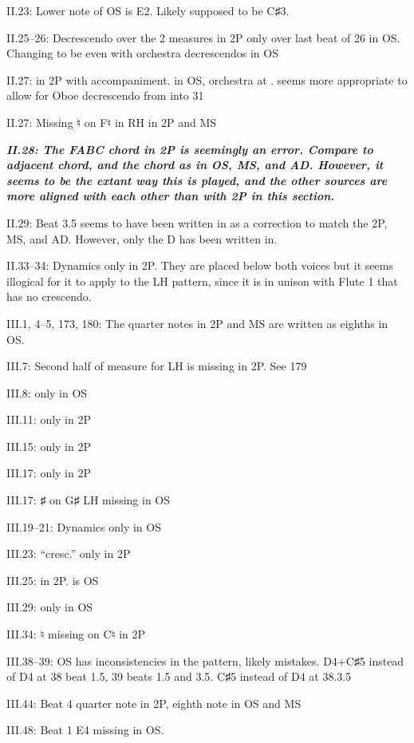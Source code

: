 \documentclass[twoside]{article}
\newcommand\dynmark[1]{\scalebox{0.9}{#1}{\kern1pt}}
\begin{document}
\begin{hangparas}{15pt}{1}
\begin{multicols}{2}
II.23: Lower note of OS is E2. Likely supposed to be C♯3.

II.25--26: Decrescendo over the 2 measures in 2P only over last beat of 26 in OS. Changing to be even with orchestra decrescendos in OS

II.27: \dynmark{\pp} in 2P with \dynmark{\mezzopiano} accompaniment. \dynmark{\p} in OS, orchestra at \dynmark{\p}. \dynmark{\pp} seems more appropriate to allow for Oboe decrescendo from \dynmark{\p} into 31

II.27: Missing ♮ on F♮ in RH in 2P and MS

\textbf{\textit{II.28: The FABC chord in 2P is seemingly an error. Compare to adjacent chord, and the chord as in OS, MS, and AD. However, it seems to be the extant way this is played, and the other sources are more aligned with each other than with 2P in this section.}}

II.29: Beat 3.5 seems to have been written in as a correction to match the 2P, MS, and AD. However, only the D has been written in.

II.33--34: Dynamics only in 2P. They are placed below both voices but it seems illogical for it to apply to the LH pattern, since it is in unison with Flute 1 that has no crescendo.

III.1, 4--5, 173, 180: The quarter notes in 2P and MS are written as eighths in OS.

III.7: Second half of measure for LH is missing in 2P. See 179

III.8: \dynmark{\mf} only in OS

III.11: \dynmark{\ff} only in 2P

III.15: \dynmark{\f} only in 2P	

III.17: \dynmark{\p} only in 2P

III.17: ♯ on G♯ LH missing in OS

III.19--21: Dynamics only in OS

III.23: ``cresc.'' only in 2P

III.25: \dynmark{\f} in 2P. \dynmark{\ff} is OS

III.29: \dynmark{\ff} only in OS

III.34: ♮ missing on C♮ in 2P

III.38--39: OS has inconsistencies in the pattern, likely mistakes. D4+C♯5 instead of D4 at 38 beat 1.5, 39 beats 1.5 and 3.5. C♯5 instead of D4 at 38.3.5

III.44: Beat 4 quarter note in 2P, eighth note in OS and MS

III.48: Beat 1 E4 missing in OS.


\end{multicols}
\end{hangparas}
\end{document}
